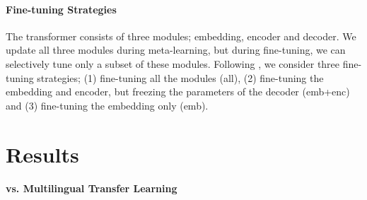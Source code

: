 \paragraph{Fine-tuning Strategies}

The transformer consists of three modules; embedding, encoder and decoder. We update all three modules during meta-learning, but during fine-tuning, we can selectively tune only a subset of these modules. Following \citep{zoph2016transfer}, we consider three fine-tuning strategies; (1) fine-tuning all the modules (all), (2) fine-tuning the embedding and encoder, but freezing the parameters of the decoder (emb+enc) and (3) fine-tuning the embedding only (emb). %








\section{Results}


\paragraph{vs. Multilingual Transfer Learning}


